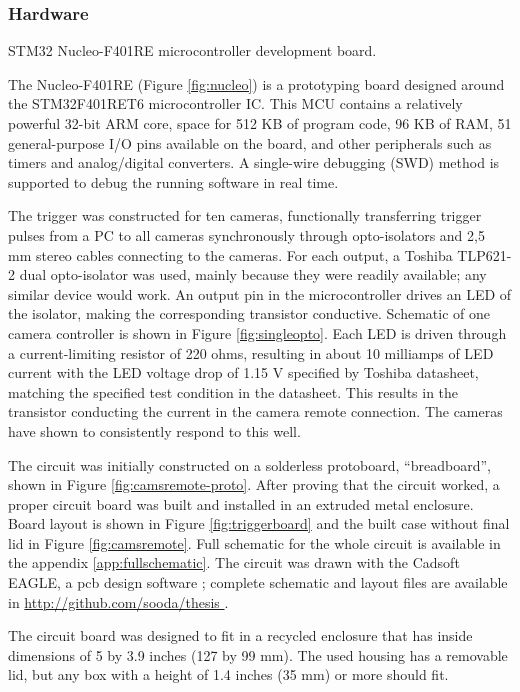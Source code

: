 \subsubsection{Hardware}

{STM32 Nucleo-F401RE microcontroller development board.}

The Nucleo-F401RE (Figure \ref{fig:nucleo}) is a prototyping board designed around the STM32F401RET6 microcontroller IC.
This MCU contains a relatively powerful 32-bit ARM core, space for 512 KB of program code, 96 KB of RAM, 51 general-purpose I/O pins available on the board, and other peripherals such as timers and analog/digital converters.
A single-wire debugging (SWD) method is supported to debug the running software in real time. \cite{stnucleo}

The trigger was constructed for ten cameras, functionally transferring trigger pulses from a PC to all cameras synchronously through opto-isolators and 2,5 mm stereo cables connecting to the cameras.
For each output, a Toshiba TLP621-2 dual opto-isolator was used, mainly because they were readily available; any similar device would work.
An output pin in the microcontroller drives an LED of the isolator, making the corresponding transistor conductive.
Schematic of one camera controller is shown in Figure \ref{fig:singleopto}.
Each LED is driven through a current-limiting resistor of 220 ohms, resulting in about 10 milliamps of LED current with the LED voltage drop of 1.15 V specified by Toshiba datasheet, matching the specified test condition in the datasheet. \cite{tlp621}
This results in the transistor conducting the current in the camera remote connection.
The cameras have shown to consistently respond to this well.

The circuit was initially constructed on a solderless protoboard, ``breadboard'', shown in Figure \ref{fig:camsremote-proto}.
After proving that the circuit worked, a proper circuit board was built and installed in an extruded metal enclosure.
Board layout is shown in Figure \ref{fig:triggerboard} and the built case without final lid in Figure \ref{fig:camsremote}.
Full schematic for the whole circuit is available in the appendix \ref{app:fullschematic}.
The circuit was drawn with the Cadsoft EAGLE, a pcb design software \cite{eaglepcb}; complete schematic and layout files are available in \url { http://github.com/sooda/thesis }.

The circuit board was designed to fit in a recycled enclosure that has inside dimensions of 5 by 3.9 inches (127 by 99 mm).
The used housing has a removable lid, but any box with a height of 1.4 inches (35 mm) or more should fit.

